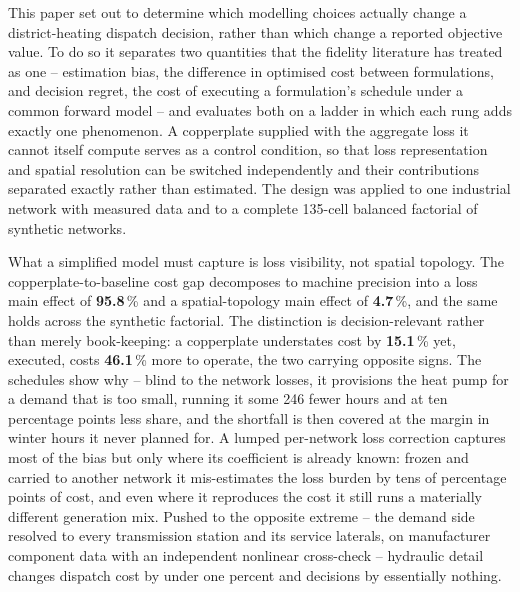 
This paper set out to determine which modelling choices actually change a district-heating
dispatch decision, rather than which change a reported objective value. To do so it
separates two quantities that the fidelity literature has treated as one -- estimation
bias, the difference in optimised cost between formulations, and decision regret, the cost
of executing a formulation's schedule under a common forward model -- and evaluates both on
a ladder in which each rung adds exactly one phenomenon. A copperplate supplied with the
aggregate loss it cannot itself compute serves as a control condition, so that loss
representation and spatial resolution can be switched independently and their contributions
separated exactly rather than estimated. The design was applied to one industrial network
with measured data and to a complete 135-cell balanced factorial of synthetic networks.

What a simplified model must capture is loss visibility, not spatial topology. The
copperplate-to-baseline cost gap decomposes to machine precision into a loss main effect of
\textbf{95.8}\,\% and a spatial-topology main effect of \textbf{4.7}\,\%, and the same
holds across the synthetic factorial. The distinction is decision-relevant rather than
merely book-keeping: a copperplate understates cost by \textbf{15.1}\,\% yet, executed,
costs \textbf{46.1}\,\% more to operate, the two carrying opposite signs. The schedules show
why -- blind to the network losses, it provisions the heat pump for a demand that is too
small, running it some 246 fewer hours and at ten percentage points less share, and the
shortfall is then covered at the margin in winter hours it never planned for. A lumped
per-network loss correction captures most of the bias but only where its coefficient is
already known: frozen and carried to another network it mis-estimates the loss burden by
tens of percentage points of cost, and even where it reproduces the cost it still runs a
materially different generation mix. Pushed to the opposite extreme -- the demand side
resolved to every transmission station and its service laterals, on manufacturer component
data with an independent nonlinear cross-check -- hydraulic detail changes dispatch cost by
under one percent and decisions by essentially nothing.

